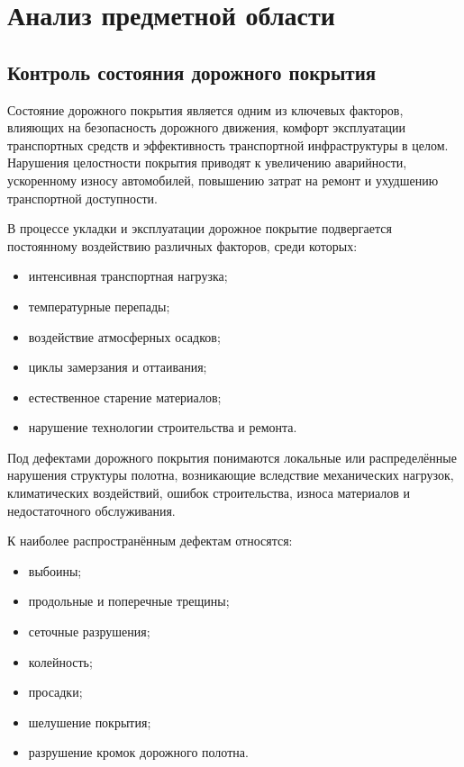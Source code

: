 \section{Анализ предметной области}

\subsection{Контроль состояния дорожного покрытия}

Состояние дорожного покрытия является одним из ключевых факторов, влияющих на безопасность дорожного движения, комфорт эксплуатации транспортных средств и эффективность транспортной инфраструктуры в целом. Нарушения целостности покрытия приводят к увеличению аварийности, ускоренному износу автомобилей, повышению затрат на ремонт и ухудшению транспортной доступности.

В процессе укладки и эксплуатации дорожное покрытие подвергается постоянному воздействию различных факторов, среди которых:

\begin{itemize}
	\item интенсивная транспортная нагрузка;
	\item температурные перепады;
	\item воздействие атмосферных осадков;
	\item циклы замерзания и оттаивания;
	\item естественное старение материалов;
	\item нарушение технологии строительства и ремонта.
\end{itemize}

Под дефектами дорожного покрытия понимаются локальные или распределённые нарушения структуры полотна, возникающие вследствие механических нагрузок, климатических воздействий, ошибок строительства, износа материалов и недостаточного обслуживания.

К наиболее распространённым дефектам относятся:

\begin{itemize}
	\item выбоины;
	\item продольные и поперечные трещины;
	\item сеточные разрушения;
	\item колейность;
	\item просадки;
	\item шелушение покрытия;
	\item разрушение кромок дорожного полотна.
\end{itemize}

